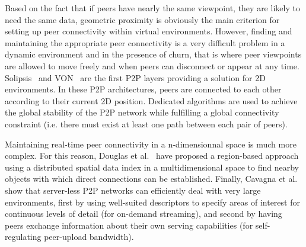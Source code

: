 Based on the fact that if peers have nearly the same viewpoint, they
are likely to need the same data, geometric proximity is obviously the
main criterion for setting up peer connectivity within virtual
environments. However, finding and maintaining the appropriate peer
connectivity is a very difficult problem in a dynamic environment and
in the presence of churn, that is where peer viewpoints are allowed to
move freely and when peers can disconnect or appear at any
time. Solipsis~\cite{keller2003} and VON~\cite{hu} are
the first P2P layers providing a solution for 2D environments. In these
P2P architectures, peers are connected to each other according to
their current 2D position. Dedicated algorithms are used to achieve
the global stability of the P2P network while fulfilling a global
connectivity constraint (i.e. there must exist at least one path
between each pair of peers). 

Maintaining real-time peer connectivity in a n-dimensionnal space is
much more complex. For this reason, Douglas et al.~\cite{douglas}
have proposed a region-based approach using a distributed spatial data
index in a multidimensional space to find nearby objects with which
direct connections can be established. Finally, Cavagna et
al.~\cite{cavagna} show that server-less P2P networks can efficiently
deal with very large environments, first by using well-suited
descriptors to specify areas of interest for continuous levels of
detail (for on-demand streaming), and second by having peers exchange
information about their own serving capabilities (for 
self-regulating peer-upload bandwidth).
 